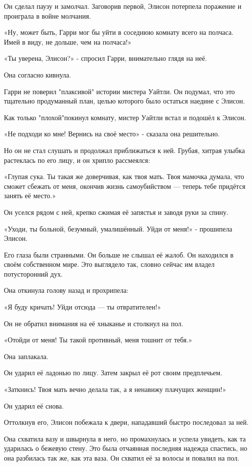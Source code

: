 \documentclass[a5paper, 9pt,
final, openany, twoside=true]{memoir}
\begin{document}
Он сделал паузу и замолчал. Заговорив первой, Элисон потерпела поражение и проиграла в войне молчания.

«Ну, может быть, Гарри мог бы уйти в соседнюю комнату всего на полчаса. Имей в виду, не дольше, чем на полчаса!»

«Ты уверена, Элисон?» - спросил Гарри, внимательно глядя на неё.

Она согласно кивнула.

Гарри не поверил "плаксивой" истории мистера Уайтли. Он подумал, что это тщательно продуманный план, целью которого было остаться наедине с Элисон.\bigskip

Как только "плохой" покинул комнату, мистер Уайтли встал и подошёл к Элисон.

«Не подходи ко мне! Вернись на своё место» - сказала она решительно.

Но он не стал слушать и продолжал приближаться к ней. Грубая, хитрая улыбка растеклась по его лицу, и он хрипло рассмеялся:

«Глупая сука. Ты такая же доверчивая, как твоя мать. Твоя мамочка думала, что сможет сбежать от меня, окончив жизнь самоубийством — теперь тебе придётся занять её место.»

Он уселся рядом с ней, крепко сжимая её запястья и заводя руки за спину.

«Уходи, ты больной, безумный, умалишённый. Уйди от меня!» - прошипела Элисон.

Его глаза были странными. Он больше не слышал её жалоб. Он находился в своём собственном мире. Это выглядело так, словно сейчас им владел потусторонний дух.

Она откинула голову назад и прохрипела:

«Я буду кричать! Уйди отсюда — ты отвратителен!»

Он не обратил внимания на её хныканье и столкнул на пол.

«Отойди от меня! Ты такой противный, меня тошнит от тебя.»

Она заплакала.

Он ударил её ладонью по лицу. Затем закрыл её рот своим предплечьем.

«Заткнись! Твоя мать вечно делала так, а я ненавижу плачущих женщин!»

Он ударил её снова.

Оттолкнув его, Элисон побежала к двери, нападавший быстро последовал за ней.

Она схватила вазу и швырнула в него, но промахнулась и успела увидеть, как та ударилась о бежевую стену. Это была отчаянная последняя надежда спастись, но она разбилась так же, как эта ваза. Он схватил её за волосы и повалил на пол.\bigskip
\end{document}
